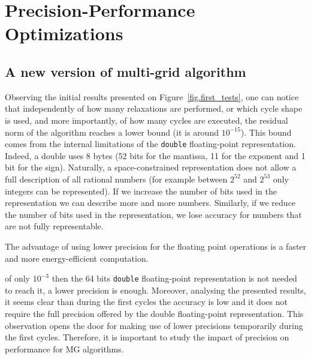 \section{Precision-Performance Optimizations}
\label{sec:precision}

\subsection{A new version of multi-grid algorithm}

Observing the initial results presented on Figure~\ref{fig.first_tests},
one can notice that independently of how many relaxations are performed, or
which cycle shape is used, and more importantly, of how many cycles are
executed, the residual norm of the algorithm reaches a lower bound (it is
around $10^{-15}$). This bound comes from the internal limitations of the
\texttt{double} floating-point representation.  Indeed, a double uses 8 bytes
(52 bits for the mantissa, 11 for the exponent and 1 bit for the sign).
Naturally, a space-constrained representation does not allow a full description
of all rational numbers (for example between $2^{52}$ and $2^{53}$ only
integers can be represented).  If we increase the number of bits used in the
representation we can describe more and more numbers. Similarly, if we reduce
the number of bits used in the representation, we lose accuracy for numbers
that are not fully representable.

The advantage of using lower precision for the floating point operations is a
faster and more energy-efficient computation. 

 of only $10^{-3}$ then the 64 bits \texttt{double} floating-point
representation is not needed to reach it, a lower precision is enough.
Moreover, analysing the presented results, it seems clear than during the first
cycles the accuracy is low and it does not require the full precision offered by
the double floating-point representation. This observation opens the door for
making use of lower precisions temporarily during the first cycles. Therefore, it
is important to study the impact of precision on performance for MG algorithms.

